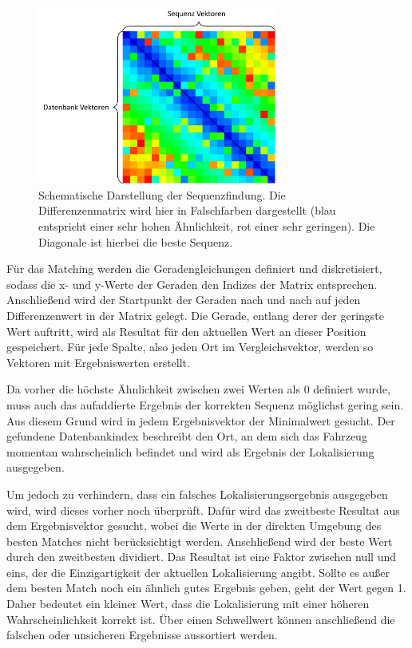 \documentclass[12pt,a4paper,titlepage]{scrartcl}
\begin{document}
\begin{figure}[h!]
	\centering
	\includegraphics[width=0.7\textwidth]{../Bilder/Differenzenmatrix_mit_Gerade.pdf}
	\caption[Schematische Darstellung der Sequenzfindung]{Schematische Darstellung der Sequenzfindung. Die Differenzenmatrix wird hier in Falschfarben dargestellt (blau entspricht einer sehr hohen Ähnlichkeit, rot einer sehr geringen). Die Diagonale ist hierbei die beste Sequenz.}
	\label{img:Diff_Mat_Gerade}
\end{figure}

Für das Matching werden die Geradengleichungen definiert und diskretisiert, sodass die x- und y-Werte der Geraden den Indizes der Matrix entsprechen. Anschließend wird der Startpunkt der Geraden nach und nach auf jeden Differenzenwert in der Matrix gelegt. Die Gerade, entlang derer der geringste Wert auftritt, wird als Resultat für den aktuellen Wert an dieser Position gespeichert. Für jede Spalte, also jeden Ort im Vergleichsvektor, werden so Vektoren mit Ergebniswerten erstellt.

Da vorher die höchste Ähnlichkeit zwischen zwei Werten als $0$ definiert wurde, muss auch das aufaddierte Ergebnis der korrekten Sequenz möglichst gering sein. Aus diesem Grund wird in jedem Ergebnisvektor der Minimalwert gesucht. Der gefundene Datenbankindex beschreibt den Ort,  an dem sich das Fahrzeug momentan wahrscheinlich befindet und wird als Ergebnis der Lokalisierung ausgegeben.

Um jedoch zu verhindern, dass ein falsches Lokalisierungsergebnis ausgegeben wird, wird dieses vorher noch überprüft. Dafür wird das zweitbeste Resultat aus dem Ergebnisvektor gesucht, wobei die Werte in der direkten Umgebung des besten Matches nicht berücksichtigt werden. Anschließend wird der beste Wert durch den zweitbesten dividiert. Das Resultat ist eine Faktor zwischen null und eins, der die Einzigartigkeit der aktuellen Lokalisierung angibt. Sollte es außer dem besten Match noch ein ähnlich gutes Ergebnis geben, geht der Wert gegen 1. Daher bedeutet ein kleiner Wert, dass die Lokalisierung mit einer höheren Wahrscheinlichkeit korrekt ist. Über einen Schwellwert können anschließend die falschen oder unsicheren Ergebnisse aussortiert werden.
\end{document}
